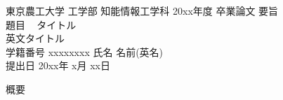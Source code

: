 \begin{center}
{\normalsize 東京農工大学 工学部 知能情報工学科 20xx年度 卒業論文 要旨}\\
{\normalsize 題目 \ }
{\large タイトル}\\
{\normalsize 英文タイトル}\\
{\normalsize 学籍番号 xxxxxxxx \hspace{20pt}}
{\normalsize 氏名 名前(英名)}\\
{\normalsize 提出日 20xx年 x月 xx日}\\
\end{center}

概要
\restoregeometry